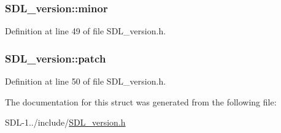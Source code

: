 \hypertarget{struct_s_d_l__version_a6c35c7bf80245028d5970e6a504ecf57}{}
\subsubsection[{minor}]{ S\+D\+L\+\_\+version\+::minor}\label{struct_s_d_l__version_a6c35c7bf80245028d5970e6a504ecf57}


Definition at line 49 of file S\+D\+L\+\_\+version.\+h.

\hypertarget{struct_s_d_l__version_aa6dacff18edee8cd037c773b843be0f1}{}
\subsubsection[{patch}]{ S\+D\+L\+\_\+version\+::patch}\label{struct_s_d_l__version_aa6dacff18edee8cd037c773b843be0f1}


Definition at line 50 of file S\+D\+L\+\_\+version.\+h.



The documentation for this struct was generated from the following file\+:\begin{DoxyCompactItemize}
\item 
S\+D\+L-\/1../include/\hyperlink{_s_d_l__version_8h}{S\+D\+L\+\_\+version.\+h}\end{DoxyCompactItemize}
